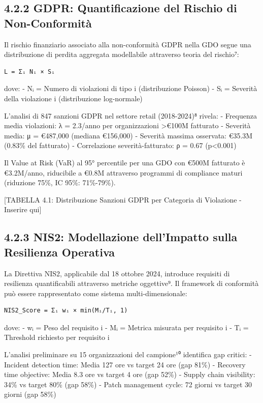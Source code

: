 \documentclass[12pt,a4paper,oneside]{book}
\numberwithin{figure}{chapter} %
\numberwithin{table}{chapter}  %
\begin{document}
\subsection{4.2.2 GDPR: Quantificazione del Rischio di
Non-Conformità}\label{gdpr-quantificazione-del-rischio-di-non-conformituxe0}

Il rischio finanziario associato alla non-conformità GDPR nella GDO
segue una distribuzione di perdita aggregata modellabile attraverso
teoria del rischio⁷:

\begin{verbatim}
L = Σᵢ Nᵢ × Sᵢ
\end{verbatim}

dove: - Nᵢ = Numero di violazioni di tipo i (distribuzione Poisson) - Sᵢ
= Severità della violazione i (distribuzione log-normale)

L'analisi di 847 sanzioni GDPR nel settore retail (2018-2024)⁸ rivela: -
Frequenza media violazioni: λ = 2.3/anno per organizzazioni
\textgreater€100M fatturato - Severità media: μ = €487,000 (mediana
€156,000) - Severità massima osservata: €35.3M (0.83\% del fatturato) -
Correlazione severità-fatturato: ρ = 0.67 (p\textless0.001)

Il Value at Risk (VaR) al 95° percentile per una GDO con €500M fatturato
è €3.2M/anno, riducibile a €0.8M attraverso programmi di compliance
maturi (riduzione 75\%, IC 95\%: 71\%-79\%).

{[}TABELLA 4.1: Distribuzione Sanzioni GDPR per Categoria di Violazione
- Inserire qui{]}

\subsection{4.2.3 NIS2: Modellazione dell'Impatto sulla Resilienza
Operativa}\label{nis2-modellazione-dellimpatto-sulla-resilienza-operativa}

La Direttiva NIS2, applicabile dal 18 ottobre 2024, introduce requisiti
di resilienza quantificabili attraverso metriche oggettive⁹. Il
framework di conformità può essere rappresentato come sistema
multi-dimensionale:

\begin{verbatim}
NIS2_Score = Σᵢ wᵢ × min(Mᵢ/Tᵢ, 1)
\end{verbatim}

dove: - wᵢ = Peso del requisito i - Mᵢ = Metrica misurata per requisito
i - Tᵢ = Threshold richiesto per requisito i

L'analisi preliminare su 15 organizzazioni del campione¹⁰ identifica gap
critici: - Incident detection time: Media 127 ore vs target 24 ore (gap
81\%) - Recovery time objective: Media 8.3 ore vs target 4 ore (gap
52\%) - Supply chain visibility: 34\% vs target 80\% (gap 58\%) - Patch
management cycle: 72 giorni vs target 30 giorni (gap 58\%)
\end{document}
